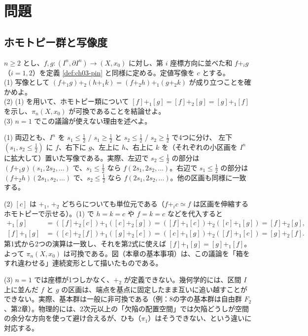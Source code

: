 \section{問題}

\subsection{ホモトピー群と写像度}

\begin{problem}[難易度 B]\label{ch03-prob-abelian}
$n\ge2$ とし、$f,g\colon(I^n,\partial I^n)\to(X,x_0)$ に対し、第 $i$ 座標方向に並べた和 $f+_ig$（$i=1,2$）を定義 \ref{def:ch03-pin} と同様に定める。定値写像を $c$ とする。\\
(1) 写像として $(f+_1g)+_2(h+_1k)=(f+_2h)+_1(g+_2k)$ が成り立つことを確かめよ。\\
(2) (1) を用いて、ホモトピー類について $[f]+_1[g]=[f]+_2[g]=[g]+_1[f]$ を示し、$\pi_n(X,x_0)$ が可換であることを結論せよ。\\
(3) $n=1$ でこの議論が使えない理由を述べよ。
\end{problem}

\begin{solution}
(1) 両辺とも、$I^n$ を $s_1\le\frac12$ / $s_1\ge\frac12$ と $s_2\le\frac12$ / $s_2\ge\frac12$ で4つに分け、
左下 $(s_1,s_2\le\frac12)$ に $f$、右下に $g$、左上に $h$、右上に $k$ を（それぞれの小区画を $I^n$ に拡大して）置いた写像である。実際、左辺で $s_2\le\frac12$ の部分は $(f+_1g)(s_1,2s_2,\dots)$ で、$s_1\le\frac12$ なら $f(2s_1,2s_2,\dots)$。右辺で $s_1\le\frac12$ の部分は $(f+_2h)(2s_1,s_2,\dots)$ で、$s_2\le\frac12$ なら $f(2s_1,2s_2,\dots)$。他の区画も同様に一致する。

(2) $[c]$ は $+_1$, $+_2$ どちらについても単位元である（$f+_ic\simeq f$ は区画を伸縮するホモトピーで示せる）。(1) で $h=k=c$ や $f=k=c$ などを代入すると
\begin{align*}
[f]+_1[g]&=([f]+_2[c])+_1([c]+_2[g])=([f]+_1[c])+_2([c]+_1[g])=[f]+_2[g],\\
[f]+_1[g]&=([c]+_2[f])+_1([g]+_2[c])=([c]+_1[g])+_2([f]+_1[c])=[g]+_2[f].
\end{align*}
第1式から2つの演算は一致し、それを第2式に使えば $[f]+_1[g]=[g]+_1[f]$。よって $\pi_n(X,x_0)$ は可換である。図（本章の基本事項）は、この議論を「箱をすれ違わせる」連続変形として描いたものである。

(3) $n=1$ では座標が1つしかなく、$+_2$ が定義できない。幾何学的には、区間 $I$ 上に並んだ $f$ と $g$ の区画は、端点を基点に固定したまま互いに追い越すことができない。実際、基本群は一般に非可換である（例：8の字の基本群は自由群 $F_2$、第2章）。物理的には、2次元以上の「欠陥の配置空間」では欠陥どうしが空間の余分な方向を使って避け合えるが、ひも（$\pi_1$）はそうできない、という違いに対応する。
\end{solution}


